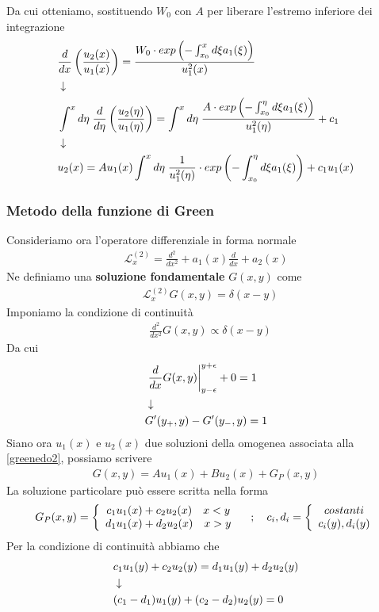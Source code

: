 Da cui otteniamo, sostituendo $W_0$ con $A$ per liberare l'estremo inferiore dei integrazione
\begin{align}
	&\frac{d}{dx} \left( \frac{u_2(x)}{u_1(x)} \right) = \frac{W_0\cdot exp\left( -\int_{x_0}^{x} d\xi a_1(\xi) \right)}{u_1^2(x)} \\ &\downarrow \nonumber \\
	& \int^x d\eta \; \frac{d}{d\eta} \left( \frac{u_2(\eta)}{u_1(\eta)} \right) =\int^x d\eta \; \frac{A \cdot exp\left( -\int_{x_0}^{\eta} d\xi a_1(\xi) \right)}{u_1^2(\eta)} + c_1 \nonumber \\ &\downarrow \nonumber \\
	&u_2(x) = Au_1(x) \int^x d\eta \; \frac{1}{u_1^2(\eta)}\cdot exp\left( -\int_{x_0}^{\eta} d\xi a_1(\xi) \right) + c_1u_1(x)
\end{align}


\subsubsection{Metodo della funzione di Green}
Consideriamo ora l'operatore differenziale in forma normale
\begin{align}
	\mathcal{L}_x^{(2)} =\frac{d^2}{dx^2} + a_1(x)\frac{d}{dx} + a_2(x)
\end{align}
Ne definiamo una \textbf{soluzione fondamentale} $G(x,y)$ come
\begin{align}
	&\mathcal{L}_x^{(2)} G(x,y)= \delta(x-y) \label{greenedo2}
\end{align}
Imponiamo la condizione di continuità 
\begin{align}
	&\frac{d^2}{dx^2}G(x,y) \propto \delta(x-y)
\end{align}
Da cui 
\begin{align}
	&\left.\frac{d}{dx}G(x,y) \right|_{y-\epsilon}^{y+\epsilon} + 0 = 1 \\ &\downarrow \nonumber \\
	&G'(y_+,y) - G'(y_-,y) = 1
\end{align}
Siano ora $u_1(x)$ e $u_2(x)$ due soluzioni della omogenea associata alla \ref{greenedo2}, possiamo scrivere
\begin{align}
	G(x,y) = A u_1(x) + B u_2(x) + G_P(x,y)
\end{align}
La soluzione particolare può essere scritta nella forma
\begin{align}
	G_P(x,y) = \left\{ \begin{array}{cc} c_1 u_1 (x) + c_2 u_2 (x) \quad x<y\\ d_1 u_1 (x) + d_2 u_2 (x) \quad x>y \end{array} \right. \quad ; \quad c_i,d_i = \left\{ \begin{array}{cc} costanti\\ c_i(y), d_i(y) \end{array} \right.
\end{align}
Per la condizione di continuità abbiamo che
\begin{align}
	&c_1 u_1 (y) + c_2 u_2 (y) = d_1 u_1 (y) + d_2 u_2 (y)\\ &\downarrow \nonumber \\
	&(c_1 - d_1) u_1 (y) +(c_2 - d_2)u_2 (y) =0
\end{align}
